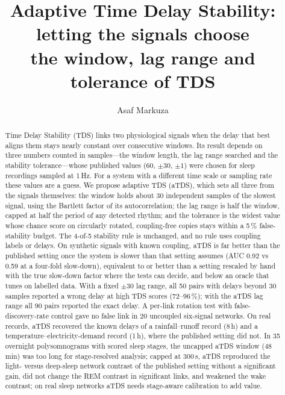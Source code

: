 \documentclass[11pt,a4paper]{article}
\title{Adaptive Time Delay Stability: letting the signals choose\\the window, lag range and tolerance of TDS}
\author{Asaf Markuza}
\date{}
\begin{document}
\maketitle

\begin{abstract}
Time Delay Stability (TDS) links two physiological signals when the delay that best aligns them stays nearly constant over consecutive windows. Its result depends on three numbers counted in samples---the window length, the lag range searched and the stability tolerance---whose published values (60, $\pm30$, $\pm1$) were chosen for sleep recordings sampled at 1\,Hz. For a system with a different time scale or sampling rate these values are a guess. We propose adaptive TDS (aTDS), which sets all three from the signals themselves: the window holds about 30 independent samples of the slowest signal, using the Bartlett factor of its autocorrelation; the lag range is half the window, capped at half the period of any detected rhythm; and the tolerance is the widest value whose chance score on circularly rotated, coupling-free copies stays within a 5\,\% false-stability budget. The 4-of-5 stability rule is unchanged, and no rule uses coupling labels or delays. On synthetic signals with known coupling, aTDS is far better than the published setting once the system is slower than that setting assumes (AUC 0.92 vs 0.59 at a four-fold slow-down), equivalent to or better than a setting rescaled by hand with the true slow-down factor where the tests can decide, and below an oracle that tunes on labelled data. With a fixed $\pm30$ lag range, all 50 pairs with delays beyond 30 samples reported a wrong delay at high TDS scores (72--96\,\%); with the aTDS lag range all 90 pairs reported the exact delay. A per-link rotation test with false-discovery-rate control gave no false link in 20 uncoupled six-signal networks. On real records, aTDS recovered the known delays of a rainfall--runoff record (8\,h) and a temperature--electricity-demand record (1\,h), where the published setting did not. In 35 overnight polysomnograms with scored sleep stages, the uncapped aTDS window (48\,min) was too long for stage-resolved analysis; capped at 300\,s, aTDS reproduced the light- versus deep-sleep network contrast of the published setting without a significant gain, did not change the REM contrast in significant links, and weakened the wake contrast; on real sleep networks aTDS needs stage-aware calibration to add value.
\end{abstract}
\end{document}
